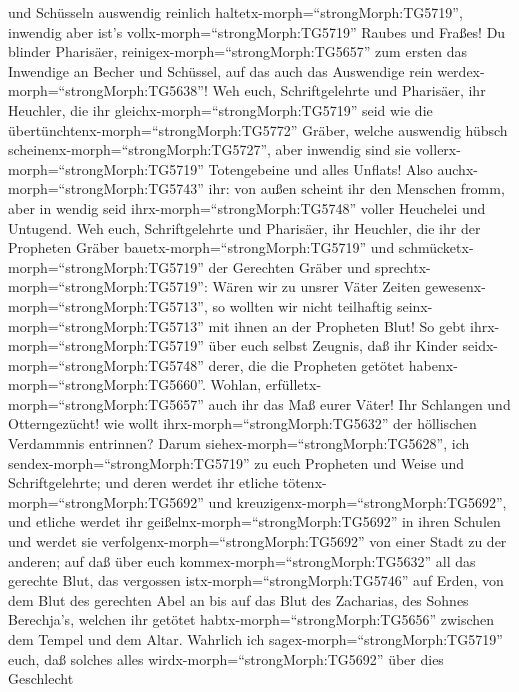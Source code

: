 und Schüsseln auswendig reinlich haltetx-morph=``strongMorph:TG5719'',
inwendig aber ist's vollx-morph=``strongMorph:TG5719'' Raubes und
Fraßes!  Du blinder Pharisäer,
reinigex-morph=``strongMorph:TG5657'' zum ersten das Inwendige an Becher
und Schüssel, auf das auch das Auswendige rein
werdex-morph=``strongMorph:TG5638''!  Weh euch,
Schriftgelehrte und Pharisäer, ihr Heuchler, die ihr
gleichx-morph=``strongMorph:TG5719'' seid wie die
übertünchtenx-morph=``strongMorph:TG5772'' Gräber, welche auswendig
hübsch scheinenx-morph=``strongMorph:TG5727'', aber inwendig sind sie
vollerx-morph=``strongMorph:TG5719'' Totengebeine und alles Unflats!
 Also auchx-morph=``strongMorph:TG5743'' ihr: von außen
scheint ihr den Menschen fromm, aber in wendig seid
ihrx-morph=``strongMorph:TG5748'' voller Heuchelei und Untugend.
 Weh euch, Schriftgelehrte und Pharisäer, ihr Heuchler, die
ihr der Propheten Gräber bauetx-morph=``strongMorph:TG5719'' und
schmücketx-morph=``strongMorph:TG5719'' der Gerechten Gräber
 und sprechtx-morph=``strongMorph:TG5719'': Wären wir zu
unsrer Väter Zeiten gewesenx-morph=``strongMorph:TG5713'', so wollten
wir nicht teilhaftig seinx-morph=``strongMorph:TG5713'' mit ihnen an der
Propheten Blut!  So gebt ihrx-morph=``strongMorph:TG5719''
über euch selbst Zeugnis, daß ihr Kinder
seidx-morph=``strongMorph:TG5748'' derer, die die Propheten getötet
habenx-morph=``strongMorph:TG5660''.  Wohlan,
erfülletx-morph=``strongMorph:TG5657'' auch ihr das Maß eurer Väter!
 Ihr Schlangen und Otterngezücht! wie wollt
ihrx-morph=``strongMorph:TG5632'' der höllischen Verdammnis entrinnen?
 Darum siehex-morph=``strongMorph:TG5628'', ich
sendex-morph=``strongMorph:TG5719'' zu euch Propheten und Weise und
Schriftgelehrte; und deren werdet ihr etliche
tötenx-morph=``strongMorph:TG5692'' und
kreuzigenx-morph=``strongMorph:TG5692'', und etliche werdet ihr
geißelnx-morph=``strongMorph:TG5692'' in ihren Schulen und werdet sie
verfolgenx-morph=``strongMorph:TG5692'' von einer Stadt zu der anderen;
 auf daß über euch kommex-morph=``strongMorph:TG5632'' all
das gerechte Blut, das vergossen istx-morph=``strongMorph:TG5746'' auf
Erden, von dem Blut des gerechten Abel an bis auf das Blut des
Zacharias, des Sohnes Berechja's, welchen ihr getötet
habtx-morph=``strongMorph:TG5656'' zwischen dem Tempel und dem Altar.
 Wahrlich ich sagex-morph=``strongMorph:TG5719'' euch, daß
solches alles wirdx-morph=``strongMorph:TG5692'' über dies Geschlecht
